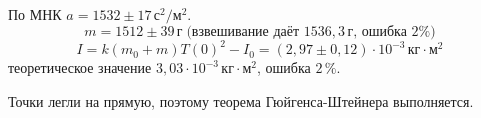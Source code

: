 По МНК $a=1532\pm 17\,\text{с}^2/\text{м}^2$.
\[m=1512\pm 39\,\text{г}\;\text{(взвешивание даёт $1536{,}3\,\text{г}$, ошибка $2\%$)}\]
\[I=k(m_0+m)T(0)^2-I_0=\left(2{,}97\pm 0{,}12\right)\cdot 10^{-3}\,\text{кг}\cdot\text{м}^2\]
теоретическое значение $3{,}03\cdot 10^{-3}\,\text{кг}\cdot\text{м}^2$, ошибка $2\,\%$.

Точки легли на прямую, поэтому теорема Гюйгенса-Штейнера выполняется.
